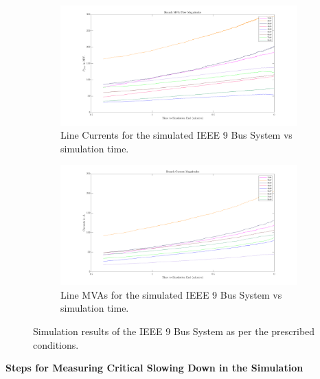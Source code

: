\begin{figure}[!htpb]
	\begin{subfigure}{\textwidth}
		\centering
		\includegraphics[scale=0.25]{../figures/analysis_matlab/currents_run02}
		\caption{Line Currents for the simulated IEEE 9 Bus System vs simulation time.}
	\end{subfigure}
	
	\begin{subfigure}{\textwidth}
		\centering
		\includegraphics[scale=0.25]{../figures/analysis_matlab/mvas_run02}
		\caption{Line MVAs for the simulated IEEE 9 Bus System vs simulation time.}
	\end{subfigure}

	\caption{Simulation results of the IEEE 9 Bus System as per the prescribed conditions.}
\end{figure}

\textbf{Steps for Measuring Critical Slowing Down in the Simulation}

